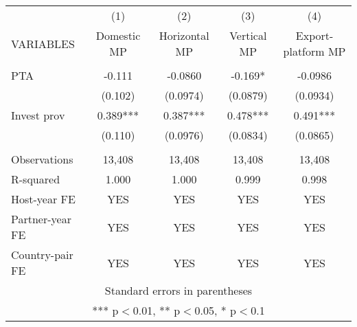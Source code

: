 \begin{tabular}{lcccc} \hline
 & (1) & (2) & (3) & (4) \\
VARIABLES & Domestic MP & Horizontal MP & Vertical MP & Export-platform MP \\ \hline
 &  &  &  &  \\
PTA & -0.111 & -0.0860 & -0.169* & -0.0986 \\
 & (0.102) & (0.0974) & (0.0879) & (0.0934) \\
Invest prov & 0.389*** & 0.387*** & 0.478*** & 0.491*** \\
 & (0.110) & (0.0976) & (0.0834) & (0.0865) \\
 &  &  &  &  \\
Observations & 13,408 & 13,408 & 13,408 & 13,408 \\
R-squared & 1.000 & 1.000 & 0.999 & 0.998 \\
Host-year FE & YES & YES & YES & YES \\
Partner-year FE & YES & YES & YES & YES \\
 Country-pair FE & YES & YES & YES & YES \\ \hline
\multicolumn{5}{c}{ Standard errors in parentheses} \\
\multicolumn{5}{c}{ *** p$<$0.01, ** p$<$0.05, * p$<$0.1} \\
\end{tabular}
